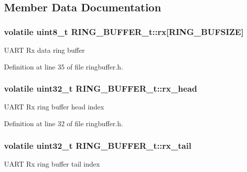 \subsection{\-Member \-Data \-Documentation}
\hypertarget{struct_r_i_n_g___b_u_f_f_e_r__t_a6551f10b0d077240ae6b92f7194a6231}{
\subsubsection[{rx}]{\setlength{\rightskip}{0pt plus 5cm}volatile uint8\-\_\-t {\bf \-R\-I\-N\-G\-\_\-\-B\-U\-F\-F\-E\-R\-\_\-t\-::rx}\mbox{[}\-R\-I\-N\-G\-\_\-\-B\-U\-F\-S\-I\-Z\-E\mbox{]}}}\label{struct_r_i_n_g___b_u_f_f_e_r__t_a6551f10b0d077240ae6b92f7194a6231}
\-U\-A\-R\-T \-Rx data ring buffer 

\-Definition at line 35 of file ringbuffer.\-h.

\hypertarget{struct_r_i_n_g___b_u_f_f_e_r__t_ada46bd9d1f401f0754f4a503fab7caf1}{
\subsubsection[{rx\-\_\-head}]{\setlength{\rightskip}{0pt plus 5cm}volatile uint32\-\_\-t {\bf \-R\-I\-N\-G\-\_\-\-B\-U\-F\-F\-E\-R\-\_\-t\-::rx\-\_\-head}}}\label{struct_r_i_n_g___b_u_f_f_e_r__t_ada46bd9d1f401f0754f4a503fab7caf1}
\-U\-A\-R\-T \-Rx ring buffer head index 

\-Definition at line 32 of file ringbuffer.\-h.

\hypertarget{struct_r_i_n_g___b_u_f_f_e_r__t_aee42ce4230a94025cd416371f9e76e78}{
\subsubsection[{rx\-\_\-tail}]{\setlength{\rightskip}{0pt plus 5cm}volatile uint32\-\_\-t {\bf \-R\-I\-N\-G\-\_\-\-B\-U\-F\-F\-E\-R\-\_\-t\-::rx\-\_\-tail}}}\label{struct_r_i_n_g___b_u_f_f_e_r__t_aee42ce4230a94025cd416371f9e76e78}
\-U\-A\-R\-T \-Rx ring buffer tail index 

